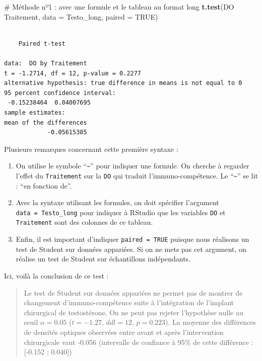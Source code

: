 \documentclass[a4paperpaper,]{article}
\newenvironment{Shaded}{\begin{snugshade}}{\end{snugshade}}
\newcommand{\CommentTok}[1]{\textcolor[rgb]{0.54,0.53,0.53}{#1}}
\newcommand{\DataTypeTok}[1]{\textcolor[rgb]{0.00,0.34,0.68}{#1}}
\newcommand{\KeywordTok}[1]{\textcolor[rgb]{0.12,0.11,0.11}{\textbf{#1}}}
\newcommand{\NormalTok}[1]{\textcolor[rgb]{0.12,0.11,0.11}{#1}}
\newcommand{\OperatorTok}[1]{\textcolor[rgb]{0.12,0.11,0.11}{#1}}
\newcommand{\OtherTok}[1]{\textcolor[rgb]{0.00,0.43,0.16}{#1}}
\newcommand{\StringTok}[1]{\textcolor[rgb]{0.75,0.01,0.01}{#1}}
\providecommand{\tightlist}{%
  \setlength{\itemsep}{0pt}\setlength{\parskip}{0pt}}
\begin{document}
\begin{Shaded}
\begin{Highlighting}[]
\CommentTok{# Méthode nº1 : avec une formule et le tableau au format long}
\KeywordTok{t.test}\NormalTok{(DO }\OperatorTok{~}\StringTok{ }\NormalTok{Traitement, }\DataTypeTok{data =}\NormalTok{ Testo_long, }\DataTypeTok{paired =} \OtherTok{TRUE}\NormalTok{)}
\end{Highlighting}
\end{Shaded}

\begin{verbatim}

    Paired t-test

data:  DO by Traitement
t = -1.2714, df = 12, p-value = 0.2277
alternative hypothesis: true difference in means is not equal to 0
95 percent confidence interval:
 -0.15238464  0.04007695
sample estimates:
mean of the differences 
            -0.05615385 
\end{verbatim}

Plusieurs remarques concernant cette première syntaxe :

\begin{enumerate}
\def\labelenumi{\arabic{enumi}.}
\tightlist
\item
  On utilise le symbole ``\texttt{\textasciitilde{}}'' pour indiquer une formule. On cherche à regarder l'effet du \texttt{Traitement} sur la \texttt{DO} qui traduit l'immuno-compétence. Le ``\texttt{\textasciitilde{}}'' se lit : ``en fonction de''.
\item
  Avec la syntaxe utilisant les formules, on doit spécifier l'argument \texttt{data\ =\ Testo\_long} pour indiquer à RStudio que les variables \texttt{DO} et \texttt{Traitement} sont des colonnes de ce tableau.
\item
  Enfin, il est important d'indiquer \texttt{paired\ =\ TRUE} puisque nous réalisons un test de Student sur données appariées. Si on ne mets pas cet argument, on réalise un test de Student sur échantillons indépendants.
\end{enumerate}

Ici, voilà la conclusion de ce test :

\begin{quote}
Le test de Student sur données appariées ne permet pas de montrer de changement d'immuno-compétence suite à l'intégration de l'implant chirurgical de testostérone. On ne peut pas rejeter l'hypothèse nulle au seuil \(\alpha = 0.05\) (\(t = -1.27\), \(ddl = 12\), \(p = 0.223\)). La moyenne des différences de densités optiques observées entre avant et après l'intervention chirurgicale vaut -0.056 (intervalle de confiance à 95\% de cette différence : {[}-0.152 ; 0.040{]})
\end{quote}
\end{document}
